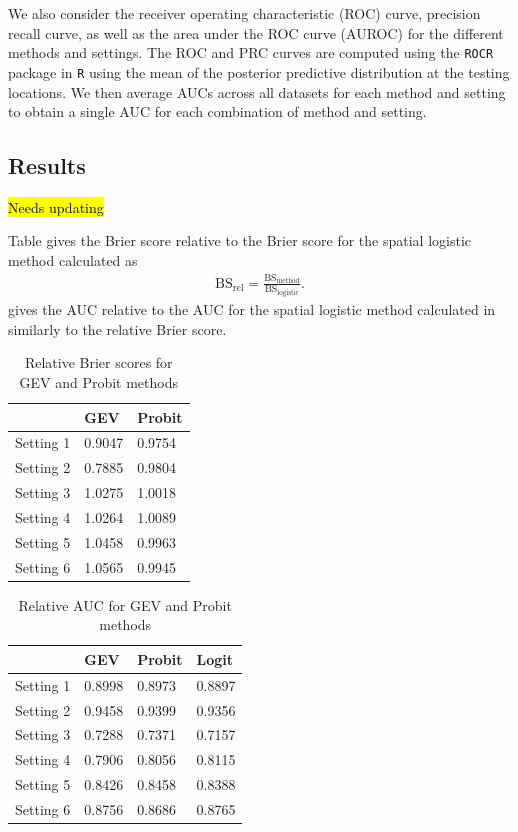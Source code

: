 \documentclass[11pt]{article}
\begin{document}
We also consider the receiver operating characteristic (ROC) curve, precision recall curve, as well as the area under the ROC curve (AUROC) for the different methods and settings.
The ROC and PRC curves are computed using the \texttt{ROCR} \citep{Sing2005} package in \texttt{R} \citep{Rmanual} using the mean of the posterior predictive distribution at the testing locations.
We then average AUCs across all datasets for each method and setting to obtain a single AUC for each combination of method and setting.

\subsection{Results}
\hl{Needs updating}

Table  gives the Brier score relative to the Brier score for the spatial logistic method calculated as
\begin{align}
  \text{BS}_{\text{rel}} = \frac{\text{BS}_{\text{method}}}{\text{BS}_{\text{logistic}}}.
\end{align}
 gives the AUC relative to the AUC for the spatial logistic method calculated in similarly to the relative Brier score.

\begin{table}
  \caption{Relative Brier scores for GEV and Probit methods}
  \label{rbtbl:simbsresults}
  \centering
  \begin{tabular}{r|ll}
    \cline{2-3}
              & GEV    & Probit\\
    \hline
    Setting 1 & 0.9047 & 0.9754\\
    Setting 2 & 0.7885 & 0.9804\\
    Setting 3 & 1.0275 & 1.0018\\
    Setting 4 & 1.0264 & 1.0089\\
    Setting 5 & 1.0458 & 0.9963\\
    Setting 6 & 1.0565 & 0.9945\\
    \hline
  \end{tabular}
\end{table}

\begin{table}
  \caption{Relative AUC for GEV and Probit methods}
  \label{rbtbl:simaucresults}
  \centering
  \begin{tabular}{r|lll}
    \cline{2-4}
              & GEV    & Probit & Logit\\
    \hline
    Setting 1 & 0.8998 & 0.8973 & 0.8897\\
    Setting 2 & 0.9458 & 0.9399 & 0.9356\\
    Setting 3 & 0.7288 & 0.7371 & 0.7157\\
    Setting 4 & 0.7906 & 0.8056 & 0.8115\\
    Setting 5 & 0.8426 & 0.8458 & 0.8388\\
    Setting 6 & 0.8756 & 0.8686 & 0.8765\\
    \hline
  \end{tabular}
\end{table}
\end{document}
